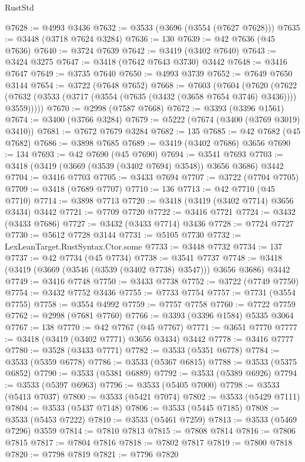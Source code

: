 \begin{lexlean}{RustStd}
\begin{coremodule}
@7628 := @4993 @3436
@7632 := @3533 (@3696 (@3554 (@7627 @7628)))
@7635 := @3448 (@3718 @7624 @3284)
@7636 := 130
@7639 := @42 @7636 (@45 @7636)
@7640 := @3724 @7639
@7642 := @3419 (@3402 @7640)
@7643 := @3424 @3275
@7647 := @3418 (@7642 @7643 @3730) @3442
@7648 := @3416 @7647
@7649 := @3735 @7640
@7650 := @4993 @3739
@7652 := @7649 @7650 @3144
@7654 := @3722 (@7648 @7652)
@7668 := @7603
    (@7604
      (@7620
        (@7622 (@7632 (@3533 (@3717 (@3554 (@7635 (@3432 (@3658 @7654 @3746) @3436)))) @3559)))))
@7670 := @2998 (@7587 @7668)
@7672 := @3393 (@3396 @1561)
@7674 := @3400 (@3766 @3284)
@7679 := @5222 (@7674 (@3400 (@3769 @3019) @3410))
@7681 := @7672 @7679 @3284
@7682 := 135
@7685 := @42 @7682 (@45 @7682)
@7686 := @3898 @7685
@7689 := @3419 (@3402 @7686) @3656
@7690 := 134
@7693 := @42 @7690 (@45 @7690)
@7694 := @3541 @7693
@7703 := @3418 (@3419 (@3669 (@3539 (@3402 @7694) @3548)) @3656 @3686) @3442
@7704 := @3416 @7703
@7705 := @3433 @7694
@7707 := @3722 (@7704 @7705)
@7709 := @3418 (@7689 @7707)
@7710 := 136
@7713 := @42 @7710 (@45 @7710)
@7714 := @3898 @7713
@7720 := @3418 (@3419 (@3402 @7714) @3656 @3434) @3442
@7721 := @7709 @7720
@7722 := @3416 @7721
@7724 := @3432 (@3433 @7686)
@7727 := @3432 (@3433 @7714) @3436
@7728 := @7724 @7727
@7730 := @5612 @7728 @3144
@7731 := @5105 @7730
@7732 := LexLeanTarget.RustSyntax.Ctor.some
@7733 := @3448 @7732
@7734 := 137
@7737 := @42 @7734 (@45 @7734)
@7738 := @3541 @7737
@7748 := @3418 (@3419 (@3669 (@3546 (@3539 (@3402 @7738) @3547))) @3656 @3686) @3442
@7749 := @3416 @7748
@7750 := @3433 @7738
@7752 := @3722 (@7749 @7750)
@7754 := @3432 @7752 @3436
@7755 := @7733 @7754
@7757 := @7731 (@3554 @7755)
@7758 := @3554 @4992
@7759 := @7757 @7758
@7760 := @7722 @7759
@7762 := @2998 (@7681 @7760)
@7766 := @3393 (@3396 @1584) @5335 @3064
@7767 := 138
@7770 := @42 @7767 (@45 @7767)
@7771 := @3651 @7770
@7777 := @3418 (@3419 (@3402 @7771) @3656 @3434) @3442
@7778 := @3416 @7777
@7780 := @3528 (@3433 @7771)
@7782 := @3533 (@5351 @6778)
@7784 := @3533 (@5359 @6778)
@7786 := @3533 (@5367 @6815)
@7788 := @3533 (@5375 @6852)
@7790 := @3533 (@5381 @6889)
@7792 := @3533 (@5389 @6926)
@7794 := @3533 (@5397 @6963)
@7796 := @3533 (@5405 @7000)
@7798 := @3533 (@5413 @7037)
@7800 := @3533 (@5421 @7074)
@7802 := @3533 (@5429 @7111)
@7804 := @3533 (@5437 @7148)
@7806 := @3533 (@5445 @7185)
@7808 := @3533 (@5453 @7222)
@7810 := @3533 (@5461 @7259)
@7813 := @3533 (@5469 @7296) @3559
@7814 := @7810 @7813
@7815 := @7808 @7814
@7816 := @7806 @7815
@7817 := @7804 @7816
@7818 := @7802 @7817
@7819 := @7800 @7818
@7820 := @7798 @7819
@7821 := @7796 @7820

\end{coremodule}
\end{lexlean}
